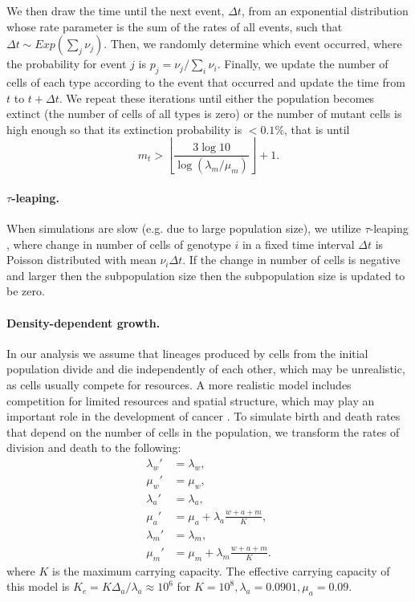 \documentclass[12pt]{extarticle}
\begin{document}
We then draw the time until the next event, $\Delta t$, from an exponential distribution whose rate parameter is the sum of the rates of all events, such that $\Delta t \sim \textit{Exp}(\sum_j \nu_j)$.
Then, we randomly determine which event occurred, where the probability for event $j$ is $p_j=\nu_j/\sum_i \nu_i$.
Finally, we update the number of cells of each type according to the event that occurred and update the time from $t$ to $t+\Delta t$.
We repeat these iterations until either the population becomes extinct (the number of cells of all types is zero) or the number of mutant cells is high enough so that its extinction probability is $<0.1\%$, that is until
\begin{equation*}
m_t > \left\lfloor\frac{3\log10}{\log\left(\lambda_m / \mu_m\right)}\right\rfloor + 1.
\end{equation*}


\paragraph{$\tau$-leaping.}
When simulations are slow (e.g. due to large population size), we utilize $\tau$-leaping \citep{gillespie2001approximate}, where change in number of cells of genotype $i$ in a fixed time interval $\Delta t$ is Poisson distributed with mean $\nu_i\Delta t$.
If the change in number of cells is negative and larger then the subpopulation size then the subpopulation size is updated to be zero.


\paragraph{Density-dependent growth.}

In our analysis we assume that lineages produced by cells from the initial population divide and die independently of each other, which may be unrealistic, as cells usually compete for resources.
A more realistic model includes competition for limited resources and spatial structure, which may play an important role in the development of cancer \citep[e.g.,][]{martens2011spatial}.
To simulate birth and death rates that depend on the number of cells in the population, we transform the rates of division and death to the following:
\begin{align*}
\lambda_w' &= \lambda_w, \\
\mu_w' &= \mu_w,\\
\lambda_a' &= \lambda_a,\\ 
\mu_a' &= \mu_a + \lambda_a\frac{w+a+m}{K},\\
\lambda_m' &= \lambda_m,\\ 
\mu_m' &= \mu_m + \lambda_m\frac{w+a+m}{K}.
\end{align*}
where $K$ is the maximum carrying capacity. The effective carrying capacity of this model is $K_e=K\Delta_a/\lambda_a\approx10^6$ for $K=10^8, \lambda_a=0.0901,\mu_a=0.09$. %
\end{document}
